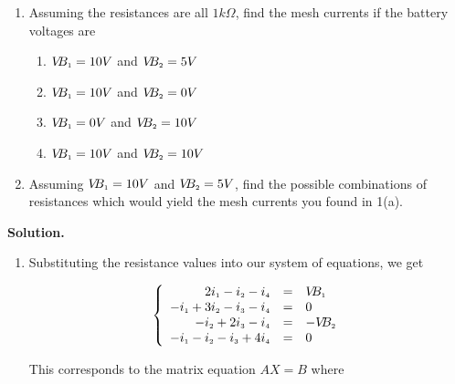 \begin{ex}
\begin{enumerate}

\item  Assuming the resistances are all $1 k\Omega$, find the mesh currents if the battery voltages are

\begin{enumerate}

\item  $V\!\!B_{\mbox{\tiny$1$}} = 10 V$ and $V\!\!B_{\mbox{\tiny$2$}} = 5 V$

\item  $V\!\!B_{\mbox{\tiny$1$}} = 10 V$ and $V\!\!B_{\mbox{\tiny$2$}} = 0 V$

\item  $V\!\!B_{\mbox{\tiny$1$}} = 0 V$ and $V\!\!B_{\mbox{\tiny$2$}} = 10 V$

\item  $V\!\!B_{\mbox{\tiny$1$}} = 10 V$ and $V\!\!B_{\mbox{\tiny$2$}} = 10 V$

\end{enumerate} 

\item  Assuming $V\!\!B_{\mbox{\tiny$1$}} = 10 V$ and $V\!\!B_{\mbox{\tiny$2$}} = 5 V$, find the possible combinations of resistances which would yield the mesh currents you found in 1(a).

\end{enumerate}

{\bf Solution.}  

\begin{enumerate}

\item  Substituting the resistance values into our system of equations, we get

\[ \left\{ \begin{array}{rcl} 2i_{\mbox{\tiny$1$}} - i_{\mbox{\tiny$2$}}-i_{\mbox{\tiny$4$}} & = & V\!\!B_{\mbox{\tiny$1$}} \\
-i_{\mbox{\tiny$1$}} + 3i_{\mbox{\tiny$2$}} - i_{\mbox{\tiny$3$}} - i_{\mbox{\tiny$4$}} & = & 0 \\
-i_{\mbox{\tiny$2$}} + 2i_{\mbox{\tiny$3$}} - i_{\mbox{\tiny$4$}} & = & -V\!\!B_{\mbox{\tiny$2$}} \\
-i_{\mbox{\tiny$1$}} - i_{\mbox{\tiny$2$}}-i_{\mbox{\tiny$3$}} + 4i_{\mbox{\tiny$4$}} & = & 0 \\  \end{array} \right.\]
                              
This corresponds to the matrix equation $AX = B$ where 


\end{enumerate}
\end{ex}
